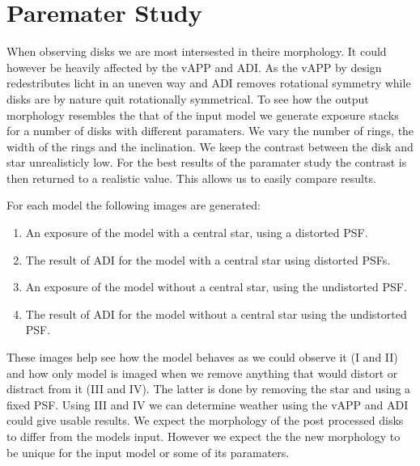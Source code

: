 \section{Paremater Study}
\label{sec:paramstudy}

When observing disks we are most intersested in theire morphology. It could however be heavily affected by the \ac{vAPP} and \ac{ADI}. As the \ac{vAPP} by design redestributes licht in an uneven way and \ac{ADI} removes rotational symmetry while disks are by nature quit rotationally symmetrical. To see how the output morphology resembles the that of the input model we generate exposure stacks for a number of disks with different paramaters. We vary the number of rings, the width of the rings and the inclination. We keep the contrast between the disk and star unrealisticly low. For the best results of the paramater study the contrast is then returned to a realistic value. This allows us to easily compare results.

For each model the following images are generated:

\begin{enumerate}[I]
\item An exposure of the model with a central star, using a distorted \ac{PSF}.
\item The result of \ac{ADI} for the model with a central star using distorted \acp{PSF}.

\item An exposure of the model without a central star, using the undistorted \ac{PSF}.
\item The result of \ac{ADI} for the model without a central star using the undistorted \ac{PSF}. %
\end{enumerate}

These images help see how the model behaves as we could observe it (I and II) and how only model is imaged when we remove anything that would distort or distract from it (III and IV). The latter is done by removing the star and using a fixed \ac{PSF}. Using III and IV we can determine weather using the \ac{vAPP} and \ac{ADI} could give usable results.
We expect the morphology of the post processed disks to differ from the models input. However we expect the the new morphology to be unique for the input model or some of its paramaters.


